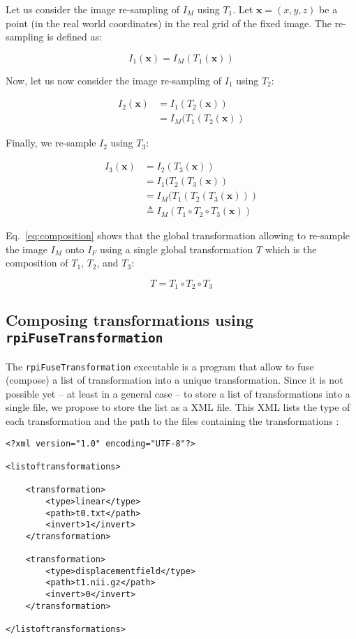 Let us consider the image re-sampling of $I_M$ using $T_1$. Let $\mathbf{x}=(x,y,z)$ be a point (in the real world coordinates) in the real grid of the fixed image. The re-sampling is defined as:

\begin{equation}
I_1(\mathbf{x}) = I_M(T_1(\mathbf{x}))
\end{equation}

Now, let us now consider the image re-sampling of $I_1$ using $T_2$:

\begin{align}
I_2(\mathbf{x}) & = I_1(T_2(\mathbf{x})) \\
                & = I_M(T_1(T_2(\mathbf{x}))
\end{align}

Finally, we re-sample $I_2$ using $T_3$:

\begin{align}
I_3(\mathbf{x}) & = I_2(T_3(\mathbf{x})) \\
                & = I_1(T_2(T_3(\mathbf{x})) \\
                & = I_M(T_1(T_2(T_3(\mathbf{x}))) \\
                & \triangleq I_M( T_1 \circ T_2 \circ T_3(\mathbf{x}) ) \label{eq:composition}
\end{align}

Eq.~\ref{eq:composition} shows that the global transformation allowing to re-sample the image $I_M$ onto $I_F$ using a single global transformation $T$ which is the composition of $T_1$, $T_2$, and $T_3$:

\begin{equation}
T = T_1 \circ T_2 \circ T_3
\end{equation}



\subsection{Composing transformations using \texttt{rpiFuseTransformation}}

The \texttt{rpiFuseTransformation} executable is a program that allow to fuse (compose) a list of transformation into a unique transformation. Since it is not possible yet -- at least in a general case -- to store a list of transformations into a single file, we propose to store the list as a XML file. This XML lists the type of each transformation and the path to the files containing the transformations :
%
\begin{lstlisting}
<?xml version="1.0" encoding="UTF-8"?>

<listoftransformations>

    <transformation>
        <type>linear</type>
        <path>t0.txt</path>
        <invert>1</invert>
    </transformation>

    <transformation>
        <type>displacementfield</type>
        <path>t1.nii.gz</path>
        <invert>0</invert>
    </transformation>

</listoftransformations>
\end{lstlisting}
%

